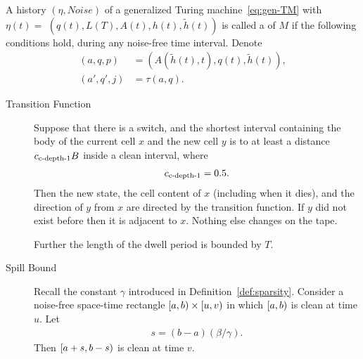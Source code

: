 \documentclass[12pt]{memoir}
\def\B{B}
\newcommand{\h}{h}
\newcommand{\hc}{\tilde h}
\newcommand{\Noise}{\mathit{Noise}}
\newcommand{\Tu}{T}
\newcommand{\cns}[1]{c_{\textrm{\upshape #1}}}
\newcommand{\cCDepth}[1]{\cns{c-depth-#1}}
\begin{document}
\begin{definition}[Trajectory]\label{def:traj}
\begin{sloppypar}
   A history  \( (\eta, \Noise) \) of a generalized Turing 
machine~\eqref{eq:gen-TM} with \(\eta(t) =\)
\( (q(t), L(T), A(t), \h(t), \hc(t)) \)
is called a  of \( M \) if the following conditions hold, during any 
noise-free time interval.
Denote 
\begin{align*}
     (a, q, p) &= (A(\hc(t),t), q(t),\hc(t)),
\\ (a',q',j)   &= \tau(a,q).
 \end{align*}
  \end{sloppypar}
\begin{description}

\item[Transition Function]\label{i:def.traj.transition}
Suppose that there is a switch, and the shortest interval
containing the body of the current cell \( x \) and the
new cell \( y \) is to at least a distance \( \cCDepth1 \B \) inside
a clean interval, where
 \begin{align}\label{eq:cns.clean-depth-1}
  \cCDepth1 =0.5.
 \end{align}
Then the new state, the cell content of \( x \) (including when it dies), and
the direction of \( y \) from \( x \) are directed by the transition function.
If \( y \) did not exist before then it is adjacent to \( x \).
Nothing else changes on the tape.

Further the length of the dwell period is bounded by \( \Tu \).


\item[Spill Bound]\label{i:spill-bound}
Recall the constant \( \gamma \) introduced in Definition~\ref{def:sparsity}.
Consider a noise-free space-time rectangle 
\( \left[a,b\right)\times \left[u,v\right) \) in which \( \left[a,b\right) \) is clean at time \( u \).
Let 
\begin{align*}
 s= (b-a)(\beta/\gamma).
 \end{align*}
Then \( \left[a+s,b-s\right) \) is clean at time \( v \).


\end{description}
\end{definition}
\end{document}
